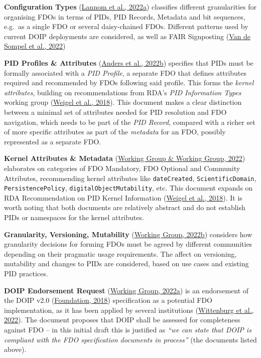 \textbf{Configuration Types} (\protect\hyperlink{ref-SPd0uEqO}{Lannom et al., 2022a}) classifies different granularities for organising FDOs in terms of PIDs, PID Records, Metadata and bit sequences, e.g.~as a single FDO or several daisy-chained FDOs. Different patterns used by current DOIP deployments are considered, as well as FAIR Signposting (\protect\hyperlink{ref-snykkm7R}{Van de Sompel et al., 2022})

\textbf{PID Profiles \& Attributes} (\protect\hyperlink{ref-ljVViWCl}{Anders et al., 2022b}) specifies that PIDs must be formally associated with a \emph{PID Profile}, a separate FDO that defines attributes required and recommended by FDOs following said profile. This forms the \emph{kernel attributes}, building on recommendations from RDA's \emph{PID Information Types} working group (\protect\hyperlink{ref-lCoshHXg}{Weigel et al., 2018}). This document makes a clear distinction between a minimal set of attributes needed for PID resolution and FDO navigation, which needs to be part of the \emph{PID Record}, compared with a richer set of more specific attributes as part of the \emph{metadata} for an FDO, possibly represented as a separate FDO.

\textbf{Kernel Attributes \& Metadata} (\protect\hyperlink{ref-Fi62cJAo}{Working Group \& Working Group, 2022}) elaborates on categories of FDO Mandatory, FDO Optional and Community Attributes, recommending kernel attributes like \texttt{dateCreated}, \texttt{ScientificDomain}, \texttt{PersistencePolicy}, \texttt{digitalObjectMutability}, etc. This document expands on RDA Recommendation on PID Kernel Information (\protect\hyperlink{ref-lCoshHXg}{Weigel et al., 2018}). It is worth noting that both documents are relatively abstract and do not establish PIDs or namespaces for the kernel attributes.

\textbf{Granularity, Versioning, Mutability} (\protect\hyperlink{ref-16W9AycSW}{Working Group, 2022b}) considers how granularity decisions for forming FDOs must be agreed by different communities depending on their pragmatic usage requirements. The affect on versioning, mutability and changes to PIDs are considered, based on use cases and existing PID practices.

\textbf{DOIP Endorsement Request} (\protect\hyperlink{ref-15yGpJ0wh}{Working Group, 2022a}) is an endorsement of the DOIP v2.0 (\protect\hyperlink{ref-13TcbsZF6}{Foundation, 2018}) specification as a potential FDO implementation, as it has been applied by several institutions (\protect\hyperlink{ref-jRWurmQc}{Wittenburg et al., 2022}). The document proposes that DOIP shall be assessed for completeness against FDO -- in this initial draft this is justified as \emph{``we can state that DOIP is compliant with the FDO specification documents in process''} (the documents listed above).

